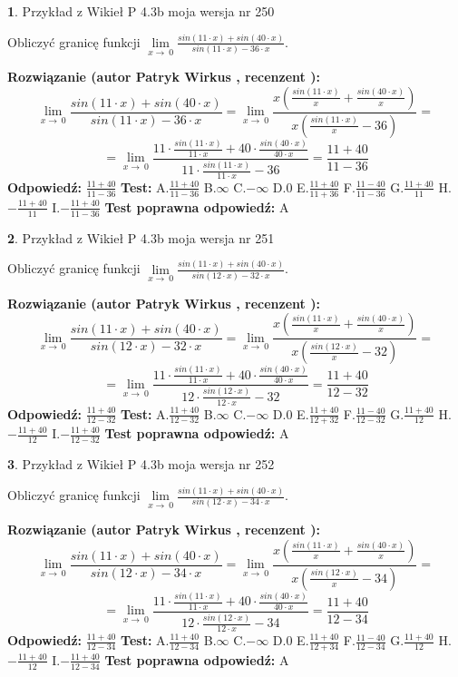 \documentclass[12pt, a4paper]{article}
\theoremstyle{definition} %
\newtheorem{zad}{}
\newcommand{\zadStart}[1]{\begin{zad}#1\newline}
\newcommand{\zadStop}{\end{zad}}
\newcommand{\rozwStart}[2]{\noindent \textbf{Rozwiązanie (autor #1 , recenzent #2): }\newline}
\newcommand{\rozwStop}{\newline}
\newcommand{\odpStart}{\noindent \textbf{Odpowiedź:}\newline}
\newcommand{\odpStop}{\newline}
\newcommand{\testStart}{\noindent \textbf{Test:}\newline}
\newcommand{\testStop}{\newline}
\newcommand{\kluczStart}{\noindent \textbf{Test poprawna odpowiedź:}\newline}
\newcommand{\kluczStop}{\newline}
\begin{document}
\zadStart{Przykład z Wikieł P 4.3b moja wersja nr 250}


Obliczyć granicę funkcji $\lim\limits_{x\to\ 0}\frac{sin(11 \cdot x)+sin(40 \cdot x)}{sin(11 \cdot x)-36 \cdot x}$.
\zadStop
\rozwStart{Patryk Wirkus}{}
$$\lim\limits_{x\to\ 0}\frac{sin(11 \cdot x)+sin(40 \cdot x)}{sin(11 \cdot x)-36 \cdot x}=\lim\limits_{x\to\ 0}\frac{x(\frac{sin(11 \cdot x)}{x}+\frac{sin(40 \cdot x)}{x})}{x(\frac{sin(11 \cdot x)}{x}-36)}=$$
$$=\lim\limits_{x\to\ 0}\frac{11 \cdot \frac{sin(11 \cdot x)}{11 \cdot x}+40 \cdot \frac{sin(40 \cdot x)}{40 \cdot x}}{11 \cdot \frac{sin(11 \cdot x)}{11 \cdot x}-36}=\frac{11+40}{11-36}$$
\rozwStop
\odpStart
$\frac{11+40}{11-36}$
\odpStop
\testStart
A.$\frac{11+40}{11-36}$
B.$\infty$
C.$-\infty$
D.$0$
E.$\frac{11+40}{11+36}$
F.$\frac{11-40}{11-36}$
G.$\frac{11+40}{11}$
H.$-\frac{11+40}{11}$
I.$-\frac{11+40}{11-36}$
\testStop
\kluczStart
A
\kluczStop



\zadStart{Przykład z Wikieł P 4.3b moja wersja nr 251}


Obliczyć granicę funkcji $\lim\limits_{x\to\ 0}\frac{sin(11 \cdot x)+sin(40 \cdot x)}{sin(12 \cdot x)-32 \cdot x}$.
\zadStop
\rozwStart{Patryk Wirkus}{}
$$\lim\limits_{x\to\ 0}\frac{sin(11 \cdot x)+sin(40 \cdot x)}{sin(12 \cdot x)-32 \cdot x}=\lim\limits_{x\to\ 0}\frac{x(\frac{sin(11 \cdot x)}{x}+\frac{sin(40 \cdot x)}{x})}{x(\frac{sin(12 \cdot x)}{x}-32)}=$$
$$=\lim\limits_{x\to\ 0}\frac{11 \cdot \frac{sin(11 \cdot x)}{11 \cdot x}+40 \cdot \frac{sin(40 \cdot x)}{40 \cdot x}}{12 \cdot \frac{sin(12 \cdot x)}{12 \cdot x}-32}=\frac{11+40}{12-32}$$
\rozwStop
\odpStart
$\frac{11+40}{12-32}$
\odpStop
\testStart
A.$\frac{11+40}{12-32}$
B.$\infty$
C.$-\infty$
D.$0$
E.$\frac{11+40}{12+32}$
F.$\frac{11-40}{12-32}$
G.$\frac{11+40}{12}$
H.$-\frac{11+40}{12}$
I.$-\frac{11+40}{12-32}$
\testStop
\kluczStart
A
\kluczStop



\zadStart{Przykład z Wikieł P 4.3b moja wersja nr 252}


Obliczyć granicę funkcji $\lim\limits_{x\to\ 0}\frac{sin(11 \cdot x)+sin(40 \cdot x)}{sin(12 \cdot x)-34 \cdot x}$.
\zadStop
\rozwStart{Patryk Wirkus}{}
$$\lim\limits_{x\to\ 0}\frac{sin(11 \cdot x)+sin(40 \cdot x)}{sin(12 \cdot x)-34 \cdot x}=\lim\limits_{x\to\ 0}\frac{x(\frac{sin(11 \cdot x)}{x}+\frac{sin(40 \cdot x)}{x})}{x(\frac{sin(12 \cdot x)}{x}-34)}=$$
$$=\lim\limits_{x\to\ 0}\frac{11 \cdot \frac{sin(11 \cdot x)}{11 \cdot x}+40 \cdot \frac{sin(40 \cdot x)}{40 \cdot x}}{12 \cdot \frac{sin(12 \cdot x)}{12 \cdot x}-34}=\frac{11+40}{12-34}$$
\rozwStop
\odpStart
$\frac{11+40}{12-34}$
\odpStop
\testStart
A.$\frac{11+40}{12-34}$
B.$\infty$
C.$-\infty$
D.$0$
E.$\frac{11+40}{12+34}$
F.$\frac{11-40}{12-34}$
G.$\frac{11+40}{12}$
H.$-\frac{11+40}{12}$
I.$-\frac{11+40}{12-34}$
\testStop
\kluczStart
A
\kluczStop
\end{document}
